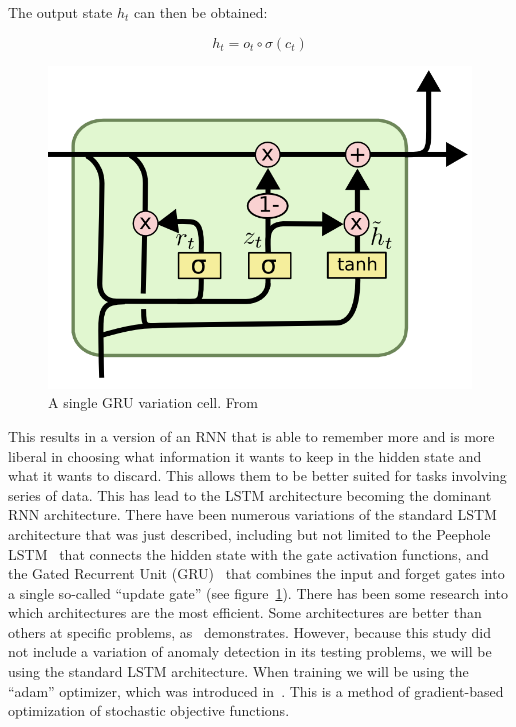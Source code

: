The output state \(h_t\) can then be obtained:

\begin{equation} \label{eq:something}
h_t = o_t \circ \sigma(c_t)
\end{equation}

\begin{figure}
	\begin{center}
		\includegraphics[scale=0.5]{rnn/gru_cell}
	\end{center}
	\caption{A single GRU variation cell. From~\cite{olah2015understanding}\label{fig:gru_cell}}
\end{figure}

This results in a version of an RNN that is able to remember more and is more liberal in choosing what information it wants to keep in the hidden state and what it wants to discard. This allows them to be better suited for tasks involving series of data. This has lead to the LSTM architecture becoming the dominant RNN architecture. There have been numerous variations of the standard LSTM architecture that was just described, including but not limited to the Peephole LSTM~\cite{gers2002learning} that connects the hidden state with the gate activation functions, and the Gated Recurrent Unit (GRU)~\cite{cho2014learning} that combines the input and forget gates into a single so-called \enquote{update gate} (see figure~\ref{fig:gru_cell}). There has been some research into which architectures are the most efficient. Some architectures are better than others at specific problems, as~\cite{jozefowicz2015empirical} demonstrates. However, because this study did not include a variation of anomaly detection in its testing problems, we will be using the standard LSTM architecture. When training we will be using the \enquote{adam} optimizer, which was introduced in~\cite{kingma2014adam}. This is a method of gradient-based optimization of stochastic objective functions.